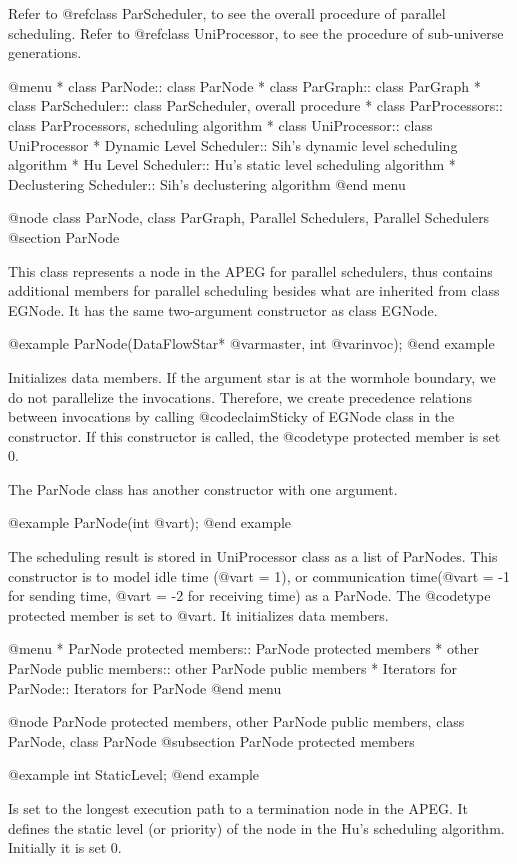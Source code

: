 Refer to @ref{class ParScheduler}, to see the overall procedure of parallel
scheduling. Refer to @ref{class UniProcessor}, to see the procedure of
sub-universe generations.

@menu
* class ParNode::		class ParNode
* class ParGraph::		class ParGraph
* class ParScheduler::		class ParScheduler, overall procedure
* class ParProcessors::		class ParProcessors, scheduling algorithm
* class UniProcessor::		class UniProcessor
* Dynamic Level Scheduler::	Sih's dynamic level scheduling algorithm
* Hu Level Scheduler::		Hu's static level scheduling algorithm
* Declustering Scheduler::	Sih's declustering algorithm
@end menu

@node class ParNode, class ParGraph, Parallel Schedulers, Parallel Schedulers
@section ParNode

This class represents a node in the APEG for parallel schedulers, thus 
contains additional members for parallel scheduling besides what are
inherited from class EGNode. It has the same two-argument 
constructor as class EGNode.

@example
ParNode(DataFlowStar* @var{master}, int @var{invoc});
@end example

Initializes data members. If the argument star is at the wormhole
boundary, we do not parallelize the invocations. Therefore, we create
precedence relations between invocations by calling @code{claimSticky}
of EGNode class in the constructor. If this constructor is called,
the @code{type} protected member is set 0.

The ParNode class has another constructor with one argument.

@example
ParNode(int @var{t});
@end example

The scheduling result is stored in UniProcessor class as a list of
ParNodes. This constructor is to model idle time (@var{t} = 1), or
communication time(@var{t} = -1 for sending time, @var{t} = -2
for receiving time) as a ParNode. The @code{type} protected member
is set to @var{t}. It initializes data members.

@menu
* ParNode protected members::		ParNode protected members
* other ParNode public members::	other ParNode public members
* Iterators for ParNode::		Iterators for ParNode
@end menu

@node ParNode protected members, other ParNode public members, class ParNode, class ParNode
@subsection ParNode protected members

@example
int StaticLevel;
@end example

Is set to the longest execution path to a termination node in the APEG.
It defines the static level (or priority) of the node in the 
Hu's scheduling algorithm. Initially it is set 0.

